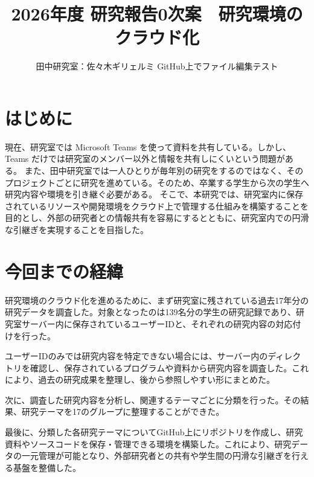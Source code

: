 \documentclass[
  10pt,       %
  twocolumn   %
]{jlreq}      %
\title{
  2026年度 研究報告0次案　研究環境のクラウド化 \\
}
\author{
 田中研究室：佐々木ギリェルミ
 GitHub上でファイル編集テスト
}
\date{
}
\begin{document}
\maketitle  %

\section{はじめに}\label{sec:Section}  %
現在、研究室では Microsoft Teams を使って資料を共有している。しかし、Teams だけでは研究室のメンバー以外と情報を共有しにくいという問題がある。
また、田中研究室では一人ひとりが毎年別の研究をするのではなく、そのプロジェクトごとに研究を進めている。そのため、卒業する学生から次の学生へ研究内容や環境を引き継ぐ必要がある。
そこで、本研究では、研究室内に保存されているリソースや開発環境をクラウド上で管理する仕組みを構築することを目的とし、外部の研究者との情報共有を容易にするとともに、研究室内での円滑な引継ぎを実現することを目指した。
 

\section{今回までの経緯}\label{sec:Section}  %

 研究環境のクラウド化を進めるために、まず研究室に残されている過去17年分の研究データを調査した。対象となったのは139名分の学生の研究記録であり、研究室サーバー内に保存されているユーザーIDと、それぞれの研究内容の対応付けを行った。

ユーザーIDのみでは研究内容を特定できない場合には、サーバー内のディレクトリを確認し、保存されているプログラムや資料から研究内容を調査した。これにより、過去の研究成果を整理し、後から参照しやすい形にまとめた。

次に、調査した研究内容を分析し、関連するテーマごとに分類を行った。その結果、研究テーマを17のグループに整理することができた。

最後に、分類した各研究テーマについてGitHub上にリポジトリを作成し、研究資料やソースコードを保存・管理できる環境を構築した。これにより、研究データの一元管理が可能となり、外部研究者との共有や学生間の円滑な引継ぎを行える基盤を整備した。



   
\end{document}
